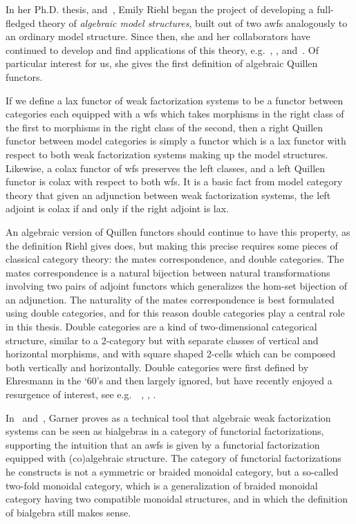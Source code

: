In her Ph.D. thesis, \cite{riehl:nwfs-model} and~\cite{riehl:nwfs-monoidal}, Emily Riehl began the project of developing a full-fledged theory of \emph{algebraic model structures}, built out of two awfs analogously to an ordinary model structure. Since then, she and her collaborators have continued to develop and find applications of this theory, e.g.~\cite{cgr:mates}, \cite{br:funct-facts}, and~\cite{bmr:six}. Of particular interest for us, she gives the first definition of algebraic Quillen functors.

If we define a lax functor of weak factorization systems to be a functor between categories each equipped with a wfs which takes morphisms in the right class of the first to morphisms in the right class of the second, then a right Quillen functor between model categories is simply a functor which is a lax functor with respect to both weak factorization systems making up the model structures. Likewise, a colax functor of wfs preserves the left classes, and a left Quillen functor is colax with respect to both wfs. It is a basic fact from model category theory that given an adjunction between weak factorization systems, the left adjoint is colax if and only if the right adjoint is lax.

An algebraic version of Quillen functors should continue to have this property, as the definition Riehl gives does, but making this precise requires some pieces of classical category theory: the mates correspondence, and double categories. The mates correspondence is a natural bijection between natural transformations involving two pairs of adjoint functors which generalizes the hom-set bijection of an adjunction. The naturality of the mates correspondence is best formulated using double categories, and for this reason double categories play a central role in this thesis. Double categories are a kind of two-dimensional categorical structure, similar to a 2-category but with separate classes of vertical and horizontal morphisms, and with square shaped 2-cells which can be composed both vertically and horizontally. Double categories were first defined by Ehresmann in the `60's and then largely ignored, but have recently enjoyed a resurgence of interest, see e.g.~~\cite{shulman:framed}, \cite{dpp:spans}, \cite{fiore:monads}.

In~\cite{garner:nwfs} and~\cite{garner:soa}, Garner proves as a technical tool that algebraic weak factorization systems can be seen as bialgebras in a category of functorial factorizations, supporting the intuition that an awfs is given by a functorial factorization equipped with (co)algebraic structure. The category of functorial factorizations he constructs is not a symmetric or braided monoidal category, but a so-called two-fold monoidal category, which is a generalization of braided monoidal category having two compatible monoidal structures, and in which the definition of bialgebra still makes sense.

